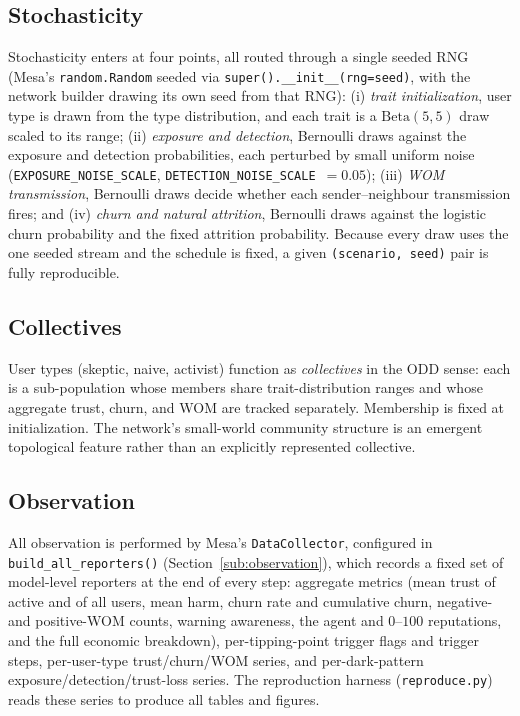 \documentclass[11pt]{article}
\newcommand{\code}[1]{\texttt{#1}}
\begin{document}
\subsection{Stochasticity}
Stochasticity enters at four points, all routed through a single seeded RNG
(Mesa's \code{random.Random} seeded via \code{super().\_\_init\_\_(rng=seed)},
with the network builder drawing its own seed from that RNG):
(i) \emph{trait initialization}, user type is drawn from the type
distribution, and each trait is a $\mathrm{Beta}(5,5)$ draw scaled to its range;
(ii) \emph{exposure and detection}, Bernoulli draws against the exposure and
detection probabilities, each perturbed by small uniform noise
(\code{EXPOSURE\_NOISE\_SCALE}, \code{DETECTION\_NOISE\_SCALE}~$=0.05$);
(iii) \emph{WOM transmission}, Bernoulli draws decide whether each
sender--neighbour transmission fires; and (iv) \emph{churn and natural attrition}, Bernoulli draws against the logistic churn probability and the fixed
attrition probability. Because every draw uses the one seeded stream and the
schedule is fixed, a given \texttt{(scenario, seed)} pair is fully reproducible.

\subsection{Collectives}
User types (skeptic, naive, activist) function as \emph{collectives} in the ODD
sense: each is a sub-population whose members share trait-distribution ranges and
whose aggregate trust, churn, and WOM are tracked separately. Membership is fixed
at initialization. The network's small-world community structure is an emergent
topological feature rather than an explicitly represented collective.

\subsection{Observation}
All observation is performed by Mesa's \code{DataCollector}, configured in
\code{build\_all\_reporters()} (Section~\ref{sub:observation}), which records a
fixed set of model-level reporters at the end of every step: aggregate metrics
(mean trust of active and of all users, mean harm, churn rate and cumulative
churn, negative- and positive-WOM counts, warning awareness, the agent and
$0$--$100$ reputations, and the full economic breakdown), per-tipping-point
trigger flags and trigger steps, per-user-type trust/churn/WOM series, and
per-dark-pattern exposure/detection/trust-loss series. The reproduction harness
(\code{reproduce.py}) reads these series to produce all tables and figures.
\end{document}
